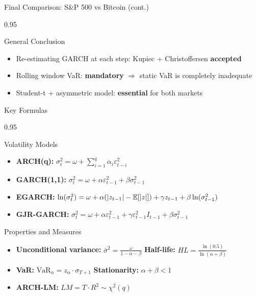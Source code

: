 \documentclass[9pt, aspectratio=169, t]{beamer}
\begin{document}
\begin{frame}{Final Comparison: S\&P 500 vs Bitcoin (cont.)}
    \begin{cminipage}{0.95\textwidth}
    {\footnotesize
    \begin{alertblock}{General Conclusion}
        \begin{itemize}\setlength{\itemsep}{0pt}
            \item Re-estimating GARCH at each step: Kupiec + Christoffersen \textbf{accepted}
            \item Rolling window VaR: \textbf{mandatory} $\Rightarrow$ static VaR is completely inadequate
            \item Student-t + asymmetric model: \textbf{essential} for both markets
        \end{itemize}
    \end{alertblock}
    }
    \end{cminipage}
\end{frame}

\begin{frame}{Key Formulas}
    \begin{cminipage}{0.95\textwidth}
    \small
    \begin{block}{Volatility Models}
        \begin{itemize}\setlength{\itemsep}{0pt}
            \item \textbf{ARCH(q):} $\sigma_t^2 = \omega + \sum_{i=1}^{q} \alpha_i \varepsilon_{t-i}^2$
            \item \textbf{GARCH(1,1):} $\sigma_t^2 = \omega + \alpha \varepsilon_{t-1}^2 + \beta \sigma_{t-1}^2$
            \item \textbf{EGARCH:} $\ln(\sigma_t^2) = \omega + \alpha(|z_{t-1}| - \mathbb{E}[|z|]) + \gamma z_{t-1} + \beta \ln(\sigma_{t-1}^2)$
            \item \textbf{GJR-GARCH:} $\sigma_t^2 = \omega + \alpha \varepsilon_{t-1}^2 + \gamma \varepsilon_{t-1}^2 I_{t-1} + \beta \sigma_{t-1}^2$
        \end{itemize}
    \end{block}

    \begin{block}{Properties and Measures}
        \begin{itemize}\setlength{\itemsep}{0pt}
            \item \textbf{Unconditional variance:} $\bar{\sigma}^2 = \frac{\omega}{1-\alpha-\beta}$ \quad \textbf{Half-life:} $HL = \frac{\ln(0.5)}{\ln(\alpha+\beta)}$
            \item \textbf{VaR:} $\text{VaR}_\alpha = z_\alpha \cdot \sigma_{T+1}$ \quad \textbf{Stationarity:} $\alpha + \beta < 1$
            \item \textbf{ARCH-LM:} $LM = T \cdot R^2 \sim \chi^2(q)$
        \end{itemize}
    \end{block}
    \end{cminipage}
\end{frame}
\end{document}
